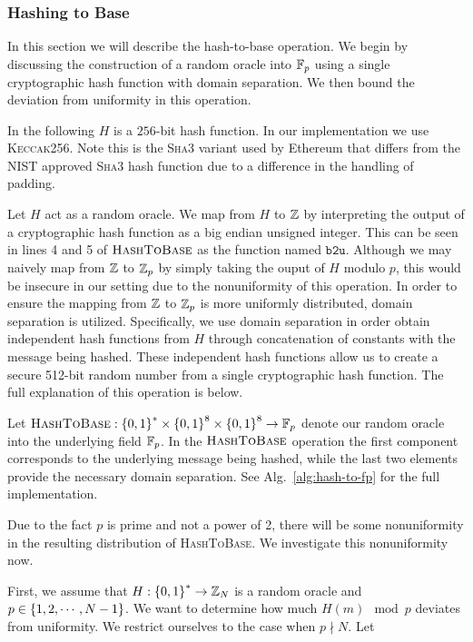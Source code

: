 \subsubsection{Hashing to Base}
\label{sssec:hash-to-base}

In this section we will describe the hash-to-base operation.
We begin by discussing the construction of a random oracle into
$\mathbb{F}_{p}$ using a single cryptographic hash function with
domain separation.
We then bound the deviation from uniformity in this operation.

In the following $H$ is a $256$-bit hash function.
In our implementation we use \textsc{Keccak256}.
Note this is the \textsc{Sha3} variant used by Ethereum
that differs from the NIST approved \textsc{Sha3} hash function due to a
difference in the handling of padding.

Let $H$ act as a random oracle.
We map from $H$ to $\mathbb{Z}$ by interpreting the output of a
cryptographic hash function as a big endian unsigned integer.
This can be seen in lines 4 and 5 of $\textsc{HashToBase}$
as the function named $\texttt{b2u}$.
Although we may naively map from $\mathbb{Z}$ to $\mathbb{Z}_{p}$ by simply taking the
ouput of $H$ modulo $p$, this would be insecure in our setting due to the
nonuniformity of this operation.
In order to ensure the mapping from $\mathbb{Z}$ to $\mathbb{Z}_{p}$ is more
uniformly distributed, domain separation is utilized.
Specifically, we use domain separation in order obtain independent hash
functions from $H$ through concatenation of constants with the message being
hashed.
These independent hash functions allow us to create a secure 512-bit random
number from a single cryptographic hash function.
The full explanation of this operation is below.

Let $\textsc{HashToBase}:\left\{ 0,1 \right\}^{*}\times\left\{ 0,1 \right\}^{8}\times
\left\{ 0,1 \right\}^{8}\to\mathbb{F}_{p}$ denote our random oracle into the
underlying field $\mathbb{F}_{p}$.
In the $\textsc{HashToBase}$ operation the first component corresponds to the
underlying message being hashed, while the last two elements provide the
necessary domain separation.
See Alg.~\ref{alg:hash-to-fp} for the full implementation.

Due to the fact $p$ is prime and not a power of 2, there will be some
nonuniformity in the resulting distribution of \textsc{HashToBase}.
We investigate this nonuniformity now.

First, we assume that $H:\left\{ 0,1 \right\}^{*}\to\mathbb{Z}_{N}$
is a random oracle and $p\in\left\{ 1,2,\cdots,N-1 \right\}$.
We want to determine how much $H(m)\mod p$ deviates from uniformity.
We restrict ourselves to the case when $p\nmid N$.
Let

